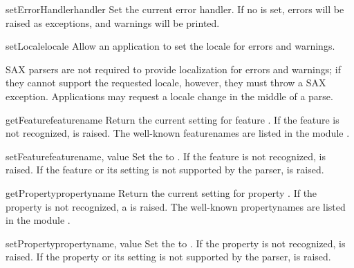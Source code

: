 \begin{methoddesc}[XMLReader]{setErrorHandler}{handler}
  Set the current error handler.  If no  is set,
  errors will be raised as exceptions, and warnings will be printed.
\end{methoddesc}

\begin{methoddesc}[XMLReader]{setLocale}{locale}
  Allow an application to set the locale for errors and warnings. 
   
  SAX parsers are not required to provide localization for errors and
  warnings; if they cannot support the requested locale, however, they
  must throw a SAX exception.  Applications may request a locale change
  in the middle of a parse.
\end{methoddesc}

\begin{methoddesc}[XMLReader]{getFeature}{featurename}
  Return the current setting for feature .  If the
  feature is not recognized,  is
  raised. The well-known featurenames are listed in the module
  .
\end{methoddesc}

\begin{methoddesc}[XMLReader]{setFeature}{featurename, value}
  Set the  to . If the feature is not
  recognized,  is raised. If the
  feature or its setting is not supported by the parser,
   is raised.
\end{methoddesc}

\begin{methoddesc}[XMLReader]{getProperty}{propertyname}
  Return the current setting for property . If the
  property is not recognized, a 
  is raised. The well-known propertynames are listed in the module
  .
\end{methoddesc}

\begin{methoddesc}[XMLReader]{setProperty}{propertyname, value}
  Set the  to . If the property is not
  recognized,  is raised. If the
  property or its setting is not supported by the parser,
   is raised.
\end{methoddesc}


